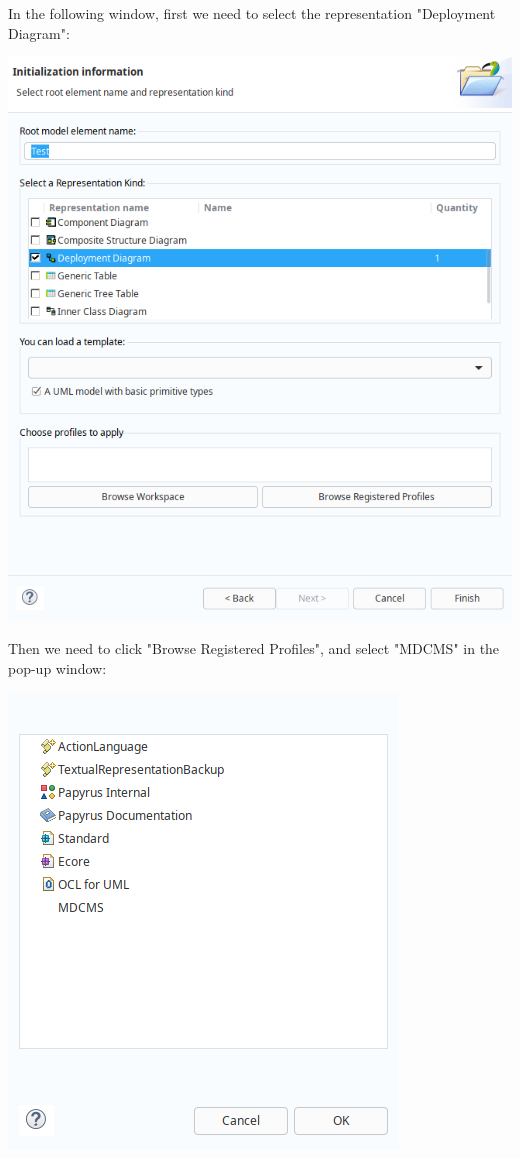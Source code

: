 \documentclass[11pt]{article}
\begin{document}
In the following window, first we need to select the representation "Deployment Diagram":

\begin{center}
\includegraphics[width=.9\linewidth]{images/project_5.png}
\end{center}
\newpage

Then we need to click "Browse Registered Profiles", and select "MDCMS" in the pop-up window:

\begin{center}
\includegraphics[width=.9\linewidth]{images/project_6.png}
\end{center}
\end{document}
